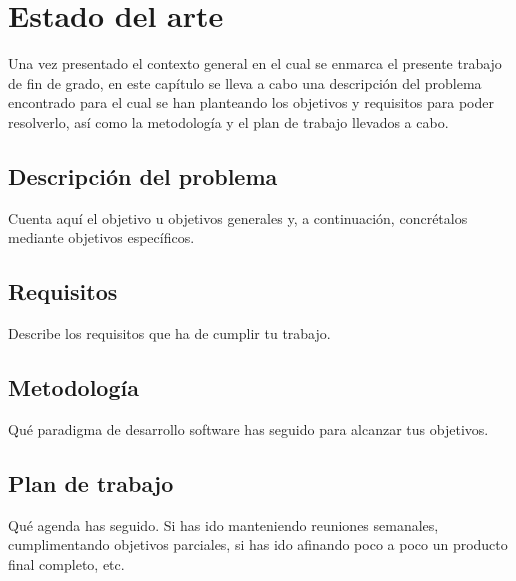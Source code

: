\chapter{Estado del arte}
\label{cap:capitulo2}
Una vez presentado el contexto general en el cual se enmarca el presente trabajo de fin de grado, en este capítulo se lleva a cabo una descripción del problema encontrado para el cual se han planteando los objetivos y requisitos para poder resolverlo, así como la metodología y el plan de trabajo llevados a cabo.\\

\section{Descripción del problema}
\label{sec:descripcion}

Cuenta aquí el objetivo u objetivos generales y, a continuación, concrétalos mediante objetivos específicos.

\section{Requisitos}
\label{sec:requisitos}

Describe los requisitos que ha de cumplir tu trabajo.

\section{Metodología}
\label{sec:metodologia}

Qué paradigma de desarrollo software has seguido para alcanzar tus objetivos.

\section{Plan de trabajo}
\label{sec:plantrabajo}

Qué agenda has seguido. Si has ido manteniendo reuniones semanales, cumplimentando objetivos parciales, si has ido afinando poco a poco un producto final completo, etc.
